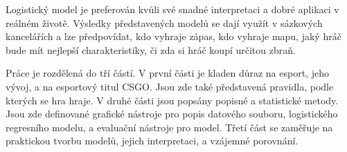 Logistický model je preferován kvůli své 
{\color{red}
snadné 
}
interpretaci a 
dobré aplikaci v reálném životě. Výsledky
{\color{red}
představených modelů se dají využít v sázkových kancelářích
}
a lze předpovídat, kdo vyhraje zápas, kdo vyhraje mapu, jaký hráč bude mít nejlepší charakteristiky, či zda si hráč koupí určitou zbraň.

Práce je rozdělená do tří částí. V první části je kladen důraz na esport, jeho vývoj, a na esportový titul \ac{CSGO}. Jsou zde také představená pravidla, podle kterých se
hra hraje. V druhé části jsou popsány popisné a statistické metody. Jsou zde definované grafické nástroje pro popis datového souboru, logistického
regresního modelu, a evaluační nástroje pro model. Třetí část se zaměřuje na praktickou tvorbu modelů, jejich interpretaci, a vzájemné porovnání.
